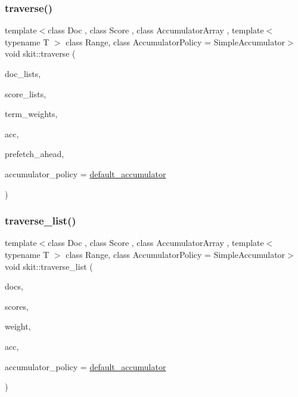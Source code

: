 \subsubsection{\texorpdfstring{traverse()}{traverse()}\hspace{0.1cm}{\footnotesize\ttfamily [2/2]}}
{\footnotesize\ttfamily template$<$class Doc , class Score , class Accumulator\+Array , template$<$ typename T $>$ class Range, class Accumulator\+Policy  = Simple\+Accumulator$>$ \\
void skit\+::traverse (\begin{DoxyParamCaption}\item[{const std\+::vector$<$ Range$<$ Doc $>$$>$ \&}]{doc\+\_\+lists,  }\item[{const std\+::vector$<$ Range$<$ Score $>$$>$ \&}]{score\+\_\+lists,  }\item[{const std\+::vector$<$ Score $>$ \&}]{term\+\_\+weights,  }\item[{Accumulator\+Array \&}]{acc,  }\item[{unsigned int}]{prefetch\+\_\+ahead,  }\item[{Accumulator\+Policy \&}]{accumulator\+\_\+policy = {\ttfamily \hyperlink{namespaceskit_ae63f577a3ddf7bf051ff06113593330e}{default\+\_\+accumulator}} }\end{DoxyParamCaption})}

\mbox{\label{namespaceskit_ad38cea8db5133ec3f3065bc1de0bfd06}} 
\subsubsection{\texorpdfstring{traverse\+\_\+list()}{traverse\_list()}\hspace{0.1cm}{\footnotesize\ttfamily [1/2]}}
{\footnotesize\ttfamily template$<$class Doc , class Score , class Accumulator\+Array , template$<$ typename T $>$ class Range, class Accumulator\+Policy  = Simple\+Accumulator$>$ \\
void skit\+::traverse\+\_\+list (\begin{DoxyParamCaption}\item[{const Range$<$ Doc $>$ \&}]{docs,  }\item[{const Range$<$ Score $>$ \&}]{scores,  }\item[{Score}]{weight,  }\item[{Accumulator\+Array \&}]{acc,  }\item[{Accumulator\+Policy \&}]{accumulator\+\_\+policy = {\ttfamily \hyperlink{namespaceskit_ae63f577a3ddf7bf051ff06113593330e}{default\+\_\+accumulator}} }\end{DoxyParamCaption})}

